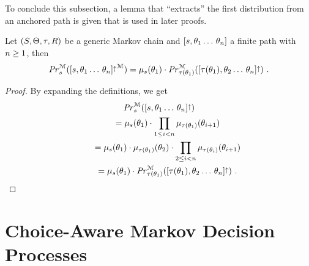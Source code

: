 To conclude this subsection, a lemma that ``extracts'' the first distribution from an anchored path is given that is used in later proofs.
\begin{lemma} \label{lemma:ExtractFirstElementFromPath}
Let $(S, \Theta, \tau, R)$ be a generic Markov chain and $[s,\theta_1\dotso\,\theta_n]$ a finite path with ${ n \ge 1}$, then
\begin{equation*}%
	\McProbInState{\state}(\McCylinder{\anctuple{\state}{\target_1\dotspath\,\target_n}}) =
	\distOfState{\state}(\target_1) \cdot \McProbInState{\targetstate(\target_1)}(\Cylinder{\anctuple{\targetstate(\target_1)}{\target_2\dotspath\,\target_n}})
	\ \text{.}
\end{equation*}
\end{lemma}
\begin{proof}
By expanding the definitions, we get
\begin{gather*}
			\McProbInState{\state}(\Cylinder{\anctuple{\state}{\target_1\dotspath\,\target_n}})\\
\qquad =	\distOfState{\state}(\target_1) \cdot \prod_{\natrangeex{i}{1}{n}} \distOfState{\targetstate(\target_1)}(\target_{i+1})\\
\qquad =	\distOfState{\state}(\target_1) \cdot \distOfState{\targetstate(\target_1)}(\target_2) \cdot \prod_{\natrangeex{i}{2}{n}} \distOfState{\targetstate(\target_i)}(\target_{i+1})\\
\qquad =	\distOfState{\state}(\target_1) \cdot \McProbInState{\targetstate(\target_1)}(\Cylinder{\anctuple{\targetstate(\target_1)}{\target_2\dotspath\,\target_n}})
\ \text{.} \qedhere
\end{gather*}
\end{proof}


\newcommand*{\PoiPaths}{\AncFinPathsOfInterest}
\newcommand*{\midwayPathProbPoi}{\midwayPathProb_{*}}
\newcommand*{\midwayPathProbPoiAtStep}[1]{\midwayPathProb_{#1}}    %
\newcommand*{\PoiPathsFromEndOf}[1]{{ \{ \ancfinpath^{*} \mid \pathjoin{#1}{\ancfinpath^{*}} \in \PoiPaths \} }}

\newcommand*{\PoiPathsFromEndOfAtStep}[2]{{ \{ \ancfinpath^{*} \mid \pathjoin{#1}{\ancfinpath^{*}} \in \PoiPaths \land \pathlength{\midwayPath^*} \le #2 \} }}




\newpage
\section{Choice-Aware Markov Decision Processes}\label{sec:FormalFoundations:CMDP}

